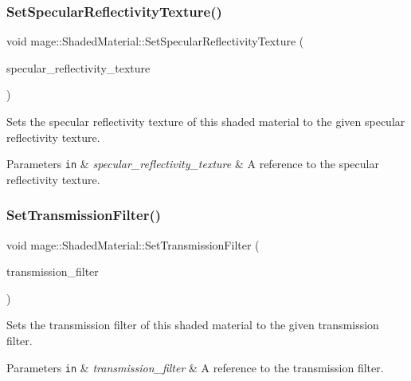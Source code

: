 \subsubsection{\texorpdfstring{Set\+Specular\+Reflectivity\+Texture()}{SetSpecularReflectivityTexture()}}
{\footnotesize\ttfamily void mage\+::\+Shaded\+Material\+::\+Set\+Specular\+Reflectivity\+Texture (\begin{DoxyParamCaption}\item[{\hyperlink{namespacemage_a1e01ae66713838a7a67d30e44c67703e}{Shared\+Ptr}$<$ \hyperlink{classmage_1_1_texture}{Texture} $>$}]{specular\+\_\+reflectivity\+\_\+texture }\end{DoxyParamCaption})}

Sets the specular reflectivity texture of this shaded material to the given specular reflectivity texture.


\begin{DoxyParams}[1]{Parameters}
\mbox{\tt in}  & {\em specular\+\_\+reflectivity\+\_\+texture} & A reference to the specular reflectivity texture. \\
\hline
\end{DoxyParams}
\hypertarget{structmage_1_1_shaded_material_a8be0968eae5daf3d566ee063925671c6}{}\label{structmage_1_1_shaded_material_a8be0968eae5daf3d566ee063925671c6} 
\subsubsection{\texorpdfstring{Set\+Transmission\+Filter()}{SetTransmissionFilter()}\hspace{0.1cm}{\footnotesize\ttfamily [1/2]}}
{\footnotesize\ttfamily void mage\+::\+Shaded\+Material\+::\+Set\+Transmission\+Filter (\begin{DoxyParamCaption}\item[{const \hyperlink{structmage_1_1_r_g_b_spectrum}{R\+G\+B\+Spectrum} \&}]{transmission\+\_\+filter }\end{DoxyParamCaption})}

Sets the transmission filter of this shaded material to the given transmission filter.


\begin{DoxyParams}[1]{Parameters}
\mbox{\tt in}  & {\em transmission\+\_\+filter} & A reference to the transmission filter. \\
\hline
\end{DoxyParams}
\hypertarget{structmage_1_1_shaded_material_a431b82b0149bda7229ba2d12123e4315}{}\label{structmage_1_1_shaded_material_a431b82b0149bda7229ba2d12123e4315} 
